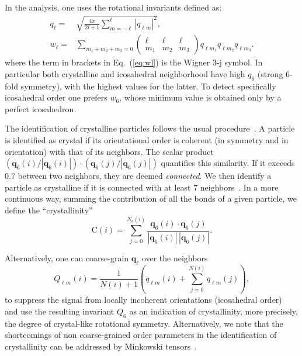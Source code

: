 \documentclass[twocolumn,superscriptaddress]{revtex4}
\begin{document}
In the analysis, one uses the rotational invariants defined as:
\begin{align}
	q_\ell =& \sqrt{\frac{4\pi}{2l+1} \sum_{m=-\ell}^{\ell} |q_{\ell m}|^2 }, \label{eq:ql}\\
	w_\ell =& \sum_{m_1+m_2+m_3=0} 
			\left( \begin{array}{ccc}
				\ell & \ell & \ell \\
				m_1 & m_2 & m_3 
			\end{array} \right)
			q_{\ell m_1} q_{\ell m_2} q_{\ell m_3}. \label{eq:wl}
\end{align}
where the term in brackets in Eq.~(\ref{eq:wl}) is the Wigner 3-j symbol.
In particular both crystalline and icosahedral neighborhood have high $q_6$ (strong 6-fold symmetry), with the highest values for the latter. To detect specifically icosahedral order one prefers $w_6$, whose minimum value is obtained only by a perfect icosahedron.

The identification of crystalline particles follows the usual procedure~\cite{auer}. A particle is identified as crystal if
its orientational order is coherent (in symmetry and in orientation) with that of its neighbors.
The scalar product $(\mathbf{q}_6(i)/|\mathbf{q}_6(i)|)\cdot(\mathbf{q}_6(j)/|\mathbf{q}_6(j)|)$ quantifies this similarity. If it exceeds $0.7$ between
two neighbors, they are deemed \emph{connected}. We then identify a particle as crystalline if it is connected with at least $7$ neighbors~\cite{auer}. In a more continuous way, summing the contribution of all the bonds of a given particle, we define the ``crystallinity''~\cite{russo_hs}
\begin{equation}\label{eqn:crystallinity}
 \text{C}(i)=\sum_{j=0}^{N_b(i)}\frac{\mathbf{q}_6(i)\cdot\mathbf{q}_6(j)}{|\mathbf{q}_6(i)|\,|\mathbf{q}_6(j)|}.
\end{equation}

Alternatively, one can coarse-grain $\mathbf{q}_\ell$ over the neighbors~\cite{lechner}
\begin{equation}
	Q_{\ell m}(i) = \frac{1}{N(i)+1}\left( q_{\ell m}(i) +  \sum_{j=0}^{N(i)} q_{\ell m}(j)\right), 
	\label{eq:Qlm}
\end{equation}
to suppress the signal from locally incoherent orientations (icosahedral order)~\cite{mathieu_icosahedra} and use the resulting invariant $Q_6$ as an indication of crystallinity, more precisely, the degree of crystal-like rotational symmetry. Alternatively, we note that the shortcomings of
non coarse-grained order parameters in the identification of crystallinity can be addressed by Minkowski tensors~\cite{kapfer2012jammed}.
\end{document}
